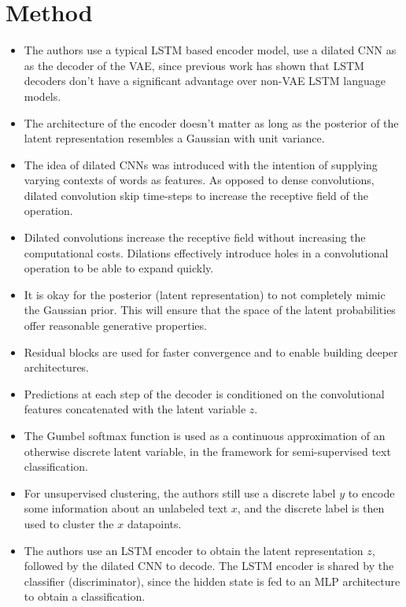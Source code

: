 \documentclass[12pt]{scrartcl}
\begin{document}
\section{Method}
  \begin{itemize}
    \item The authors use a typical LSTM based encoder model, use a dilated CNN as as the decoder of the VAE, since previous work has shown that LSTM decoders don't have a significant advantage over non-VAE LSTM language models.
    \item The architecture of the encoder doesn't matter as long as the posterior of the latent representation resembles a Gaussian with unit variance.
    \item The idea of dilated CNNs was introduced with the intention of supplying varying contexts of words as features. As opposed to dense convolutions, dilated convolution skip time-steps to increase the receptive field of the operation.
    \item Dilated convolutions increase the receptive field without increasing the computational costs. Dilations effectively introduce holes in a convolutional operation to be able to expand quickly.
    \item It is okay for the posterior (latent representation) to not completely mimic the Gaussian prior. This will ensure that the space of the latent probabilities offer reasonable generative properties.
    \item Residual blocks are used for faster convergence and to enable building deeper architectures.
    \item Predictions at each step of the decoder is conditioned on the convolutional features concatenated with the latent variable $z$.
    \item The Gumbel softmax function is used as a continuous approximation of an otherwise discrete latent variable, in the framework for semi-supervised text classification.
    \item For unsupervised clustering, the authors still use a discrete label $y$ to encode some information about an unlabeled text $x$, and the discrete label is then used to cluster the $x$ datapoints.
    \item The authors use an LSTM encoder to obtain the latent representation $z$, followed by the dilated CNN to decode. The LSTM encoder is shared by the classifier (discriminator), since the hidden state is fed to an MLP architecture to obtain a classification.
  \end{itemize}
\end{document}
